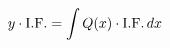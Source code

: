 \documentclass[preview]{standalone}
\begin{document}
\begin{align*}
\special{dvisvgm:raw <g id='unique000'>}y \cdot \text{I.F.} = \int Q(x) \cdot \text{I.F.}\,dx\special{dvisvgm:raw </g>}
\end{align*}
\end{document}
